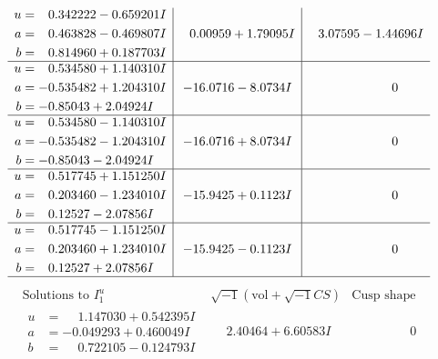 \documentclass[1p]{elsarticle_modified}
\theoremstyle{definition}
\newcommand{\I}{\sqrt{-1}}
\begin{document}
$$\begin{array}{c|c|c}
\begin{aligned}
u &= \phantom{-}0.342222 - 0.659201 I \\
a &= \phantom{-}0.463828 - 0.469807 I \\
b &= \phantom{-}0.814960 + 0.187703 I\end{aligned}
 & \phantom{-}0.00959 + 1.79095 I & \phantom{-}3.07595 - 1.44696 I \\ \hline\begin{aligned}
u &= \phantom{-}0.534580 + 1.140310 I \\
a &= -0.535482 + 1.204310 I \\
b &= -0.85043 + 2.04924 I\end{aligned}
 & -16.0716 - 8.0734 I & \phantom{-0.000000 } 0 \\ \hline\begin{aligned}
u &= \phantom{-}0.534580 - 1.140310 I \\
a &= -0.535482 - 1.204310 I \\
b &= -0.85043 - 2.04924 I\end{aligned}
 & -16.0716 + 8.0734 I & \phantom{-0.000000 } 0 \\ \hline\begin{aligned}
u &= \phantom{-}0.517745 + 1.151250 I \\
a &= \phantom{-}0.203460 - 1.234010 I \\
b &= \phantom{-}0.12527 - 2.07856 I\end{aligned}
 & -15.9425 + 0.1123 I & \phantom{-0.000000 } 0 \\ \hline\begin{aligned}
u &= \phantom{-}0.517745 - 1.151250 I \\
a &= \phantom{-}0.203460 + 1.234010 I \\
b &= \phantom{-}0.12527 + 2.07856 I\end{aligned}
 & -15.9425 - 0.1123 I & \phantom{-0.000000 } 0\\
 \hline 
 \end{array}$$\newpage$$\begin{array}{c|c|c}  
\text{Solutions to }I^u_{1}& \I (\text{vol} + \sqrt{-1}CS) & \text{Cusp shape}\\
 \hline 
\begin{aligned}
u &= \phantom{-}1.147030 + 0.542395 I \\
a &= -0.049293 + 0.460049 I \\
b &= \phantom{-}0.722105 - 0.124793 I\end{aligned}
 & \phantom{-}2.40464 + 6.60583 I & \phantom{-0.000000 } 0 \\ \hline\begin{aligned}

\end{aligned}
\end{array}$$
\end{document}
